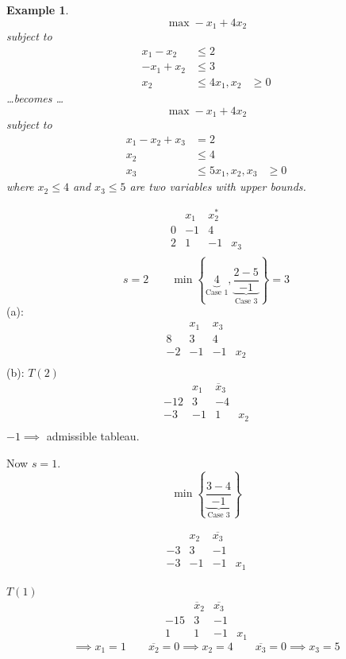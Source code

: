 \documentclass{article}
\numberwithin{lecref}{section}
\newcounter{exercises}
\newtheorem{example}[exercises]{Example}
\newcommand{\Set}[1]{\left\{#1\right\}}
\begin{document}
\begin{description}
		\begin{example}
			\[ \max -x_1 + 4x_2 \]
			subject to
			\begin{align*}
				x_1 - x_2 &\leq 2 \\
				-x_1 + x_2 &\leq 3 \\
				x_2 &\leq 4
				x_1, x_2 &\geq 0
			\end{align*}
			\dots becomes \dots
			\[ \max -x_1 + 4x_2 \]
			subject to
			\begin{align*}
				x_1 - x_2 + x_3 &= 2 \\
				x_2 &\leq 4 \\
				x_3 &\leq 5
				x_1, x_2, x_3 &\geq 0
			\end{align*}
			where $x_2 \leq 4$ and $x_3 \leq 5$ are two variables with upper bounds.
		\end{example}

		\begin{center}
			\[\begin{array}{c|ccc}
				  & x_1 & x_2^* & \\
				0 & -1 & 4 & \\
			\hline
				2 & 1 & -1 & x_3 \\
			\end{array}\]
			\[ s = 2 \qquad \min\Set{\underbrace{4}_{\text{Case 1}}, \underbrace{\frac{2 - 5}{-1}}_{\text{Case 3}}} = 3 \]
			(a):
			\[\begin{array}{c|ccc}
				  & x_1 & x_3 \\
				8 & 3 & 4 & \\
			\hline
				-2 & -1 & -1 & x_2 \\
			\end{array}\]
			(b): $T(2)$
			\[\begin{array}{c|ccc}
				  & x_1 & \overline x_3 \\
				-12 & 3 & -4 & \\
			\hline
				-3 & -1 & 1 & x_2 \\
			\end{array}\]
			$-1 \implies$ admissible tableau.

			Now $s = 1$.
			\[ \min\Set{\underbrace{\frac{3-4}{-1}}_{\text{Case 3}}} \]

			\[\begin{array}{c|ccc}
				   & x_2 & \overline{x_3} & \\
				-3 & 3 & -1 & \\
			\hline
				-3 & -1 & -1 & x_1
			\end{array}\]

			$T(1)$
			\[\begin{array}{c|ccc}
				    & \overline x_2 & \overline{x_3} & \\
				-15 & 3 & -1 & \\
			\hline
				1 & 1 & -1 & x_1
			\end{array}\]
			\[ \implies x_1 = 1 \qquad \overline{x_2} = 0 \implies x_2 = 4 \qquad \overline{x_3} = 0 \implies x_3 = 5 \]
		\end{center}
\end{description}
\end{document}
